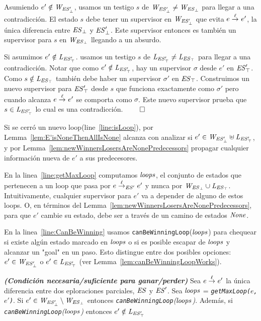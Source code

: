 \begin{Proof Sketch}
Asumiendo $e' \notin \mathit{W_{\mathit{\mathit{ES}'_{\bot}}}}$, usamos un testigo $s$ de $\mathit{W_{\mathit{\mathit{ES}'_{\bot}}}} \neq 
\mathit{W_{\mathit{\mathit{ES}_{\bot}}}}$ para llegar a una contradicción. El estado $s$ debe tener un supervisor en 
$\mathit{W_{\mathit{\mathit{ES}'_{\bot}}}}$ que evita $e \overset{\ell}{\rightarrow}_{} e'$, la única diferencia entre $\mathit{\mathit{ES}_{\bot}}$ y $\mathit{\mathit{ES}'_{\bot}}$. Este supervisor entonces es también un supervisor para $s$ en $\mathit{W_{\mathit{\mathit{ES}_{\bot}}}}$ llegando a un absurdo. 

Si asumimos $e' \notin \mathit{L_{\mathit{\mathit{ES}'_{\top}}}}$.  usamos un testigo $s$ de $\mathit{L_{\mathit{\mathit{ES}'_{\top}}}} \neq \mathit{L_{\mathit{\mathit{ES}_{\top}}}}$ para llegar a una contradicción. Notar que como $e' \notin \mathit{L_{\mathit{\mathit{ES}'_{\top}}}}$, hay un supervisor $\sigma$ desde $e'$ en  
$\mathit{\mathit{ES}'_{\top}}$. Como $s \notin \mathit{L_{\mathit{\mathit{ES}_{\top}}}}$ también debe haber un supervisor $\sigma'$ en $\mathit{\mathit{ES}_{\top}}$. Construimos un nuevo supervisor para $\mathit{\mathit{ES}'_{\top}}$ desde $s$ que funciona exactamente como $\sigma'$ pero cuando alcanza $e \overset{\ell}{\rightarrow}_{} e'$ se comporta como $\sigma$. Este nuevo supervisor prueba que $s \in \mathit{L_{\mathit{\mathit{ES}'_{\top}}}}$ lo cual es una contradicción. \hfill$\qed$
\end{Proof Sketch}

Si se cerró un nuevo loop(line~\ref{line:isLoop}), por Lemma~\ref{lem:E'isNoneThenAllIsNone} alcanza con analizar si $e' 
\in \mathit{W_{\mathit{\mathit{ES}'_{\bot}}}} \uplus \mathit{L_{\mathit{\mathit{ES}'_{\top}}}}$, y por Lemma~\ref{lem:newWinnersLosersAreNonePredecessors} propagar cualquier información nueva de $e'$ a sus predecesores. 

En la linea~\ref{line:getMaxLoop} computamos $\mathit{loops}$, el conjunto de estados que pertenecen a un loop que pasa por $e \overset{\ell}{\rightarrow}_{\mathit{ES}'} e'$ y nunca por $\mathit{W_{\mathit{\mathit{ES}_{\bot}}}} \cup \mathit{L_{\mathit{\mathit{ES}_{\top}}}}$. 
Intuitivamente, cualquier supervisor para $e'$ va a depender de alguno de estos loops. O, en términos del Lemma~\ref{lem:newWinnersLosersAreNonePredecessors}, para que $e'$ cambie su estado, debe ser a través de un camino de estados $\mathit{None}$. 

En la linea~\ref{line:CanBeWinning} usamos \texttt{canBeWinningLoop}($\mathit{loops}$) para chequear si existe algún estado marcado en $\mathit{loops}$ o si es posible escapar de $\mathit{loops}$ y alcanzar un "goal" en un paso. Esto distingue entre dos posibles opciones: $e' \in \mathit{W_{\mathit{\mathit{ES}'_{\bot}}}}$ o $e' \in \mathit{L_{\mathit{\mathit{ES}'_{\top}}}}$ (ver 
Lemma~\ref{lem:canBeWinningLoopWorks}). 

\begin{lemma}\textbf{\emph{(Condición necesaria/suficiente para ganar/perder)}}
\label{lem:canBeWinningLoopWorks}
Sea $e \overset{\ell}{\rightarrow}_{} e'$ la única diferencia entre dos eploraciones parciales, 
$\mathit{ES}$ y $\mathit{ES}'$. Sea $\mathit{loops}$ = \emph{\texttt{getMaxLoop($e$, 
$e'$)}}.
Si $e' \in \mathit{W_{\mathit{\mathit{ES}'_{\bot}}}} \setminus \mathit{W_{\mathit{\mathit{ES}_{\bot}}}}$ 
entonces \emph{\texttt{canBeWinningLoop}($\mathit{loops}$)}. Además, si \\ 
\emph{\texttt{canBeWinningLoop}($\mathit{loops}$)} entonces $e' \notin \mathit{L_{\mathit{\mathit{ES}'_{\top}}}}$ 
\end{lemma}

